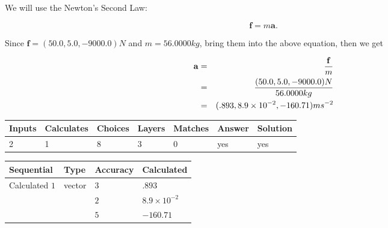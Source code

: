 \documentclass[12pt]{article}
\begin{document}
 
 
\noindent{}
 
 

 
 
 
\noindent{}
 
 

We will use the Newton's Second Law:
 
\[
\mathbf{f}=m\mathbf{a}.
\]
 
Since $\mathbf{f}= %
(50.0 , 5.0 , -9000.0) N$
and $m= %
56.0000kg$, bring them into the above equation, then we get
 
\begin{eqnarray*}
\mathbf{a}&=&\frac{\mathbf{f}}m  \\
&=&\frac{ %
(50.0 , 5.0 , -9000.0) N}{ %
56.0000kg}  \\
&=& %
(.893 , 8.9 \times 10^{-2} , -160.71) ms^{-2}
\end{eqnarray*}
 
 
 
\noindent{}
 
 

 
\vspace{0.3in}
   
   
   
   
\noindent\begin{tabular}{|l|l|l|l|l|l|l|}
 \hline
Inputs & Calculates & Choices & Layers & Matches & Answer & Solution \\ \hline
           2 & 
           1 & 
           8
  & 
           3 & 
           0 & 
  yes & 
  yes 
  \\ \hline
 \end{tabular}
   
   
   
   
\noindent{}
   
   
  
  
\noindent\begin{tabular}{|l|l|l|l|}
\hline
 Sequential & Type & Accuracy & Calculated \\ 
\hline
 
 
  Calculated $           1$ & vector &  
  $           3 $ 
 &  $ .893 $ 
 \\    
  & & 
  $           2 $ 
 &  $ 8.9 \times 10^{-2} $ 
 \\    
  & & 
  $           5 $ 
 &  $ -160.71 $ 
 \\  \hline  
 \end{tabular}
   
\end{document}
